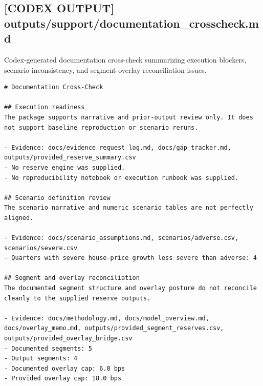 \documentclass[11pt]{article}
\begin{document}
\subsection*{[CODEX OUTPUT] outputs/support/documentation\_crosscheck.md}
Codex-generated documentation cross-check summarizing execution blockers, scenario inconsistency, and segment-overlay reconciliation issues.
\begin{Verbatim}[fontsize=\small]
# Documentation Cross-Check

## Execution readiness
The package supports narrative and prior-output review only. It does not support baseline reproduction or scenario reruns.

- Evidence: docs/evidence_request_log.md, docs/gap_tracker.md, outputs/provided_reserve_summary.csv
- No reserve engine was supplied.
- No reproducibility notebook or execution runbook was supplied.

## Scenario definition review
The scenario narrative and numeric scenario tables are not perfectly aligned.

- Evidence: docs/scenario_assumptions.md, scenarios/adverse.csv, scenarios/severe.csv
- Quarters with severe house-price growth less severe than adverse: 4

## Segment and overlay reconciliation
The documented segment structure and overlay posture do not reconcile cleanly to the supplied reserve outputs.

- Evidence: docs/methodology.md, docs/model_overview.md, docs/overlay_memo.md, outputs/provided_segment_reserves.csv, outputs/provided_overlay_bridge.csv
- Documented segments: 5
- Output segments: 4
- Documented overlay cap: 6.0 bps
- Provided overlay cap: 18.0 bps
\end{Verbatim}
\end{document}

